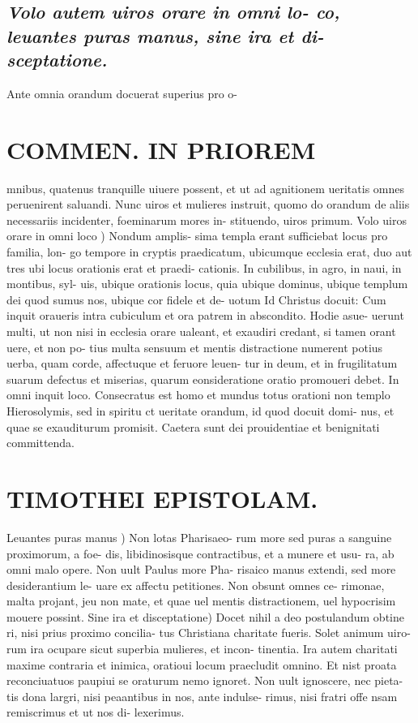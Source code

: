 \documentclass{article}
\begin{document}
\begin{pages}
\subsection*{\textit{Volo autem uiros orare in omni lo- co, leuantes puras manus, sine ira et di- sceptatione. }}\pstart Ante omnia orandum docuerat superius pro o-  \pend
\section*{COMMEN. IN PRIOREM }
\marginpar{[ p.55 ]}\pstart mnibus, quatenus tranquille uiuere possent, et ut ad agnitionem ueritatis omnes peruenirent saluandi. Nunc uiros et mulieres instruit, quomo do orandum de aliis necessariis incidenter, foeminarum mores in- stituendo, uiros primum.  \pend\pstart Volo uiros orare in omni loco ) Nondum amplis- sima templa erant sufficiebat locus pro familia, lon- go tempore in cryptis praedicatum, ubicumque ecclesia erat, duo aut tres ubi locus orationis erat et praedi- cationis. In cubilibus, in agro, in naui, in montibus, syl- uis, ubique orationis locus, quia ubique dominus, ubique  templum dei quod sumus nos, ubique cor fidele et de- uotum Id Christus docuit: Cum inquit oraueris intra cubiculum et ora patrem in abscondito. Hodie asue- uerunt multi, ut non nisi in ecclesia orare ualeant, et exaudiri credant, si tamen orant uere, et non po- tius multa sensuum et mentis distractione numerent potius uerba, quam corde, affectuque et feruore leuen- tur in deum, et in frugilitatum suarum defectus et miserias, quarum eonsideratione oratio promoueri debet. In omni inquit loco. Consecratus est homo et mundus totus orationi non templo Hierosolymis, sed in spiritu ct ueritate orandum, id quod docuit domi- nus, et quae se exauditurum promisit. Caetera sunt dei prouidentiae et benignitati committenda.  \pend
\section*{TIMOTHEI EPISTOLAM. }
\marginpar{[ p.56 ]}\pstart Leuantes puras manus ) Non lotas Pharisaeo- rum more sed puras a sanguine proximorum, a foe- dis, libidinosisque contractibus, et a munere et usu- ra, ab omni malo opere. Non uult Paulus more Pha- risaico manus extendi, sed more desiderantium le- uare ex affectu petitiones. Non obsunt omnes ce- rimonae, malta projant, jeu non mate, et quae uel mentis distractionem, uel hypocrisim mouere possint.  \pend\pstart Sine ira et disceptatione) Docet nihil a deo postulandum obtine ri, nisi prius proximo concilia- tus Christiana charitate fueris. Solet animum uiro- rum ira ocupare sicut superbia mulieres, et incon- tinentia. Ira autem charitati maxime contraria et inimica, oratioui locum praecludit omnino. Et nist proata reconciuatuos paupiui se oraturum nemo ignoret. Non uult ignoscere, nec pieta- tis dona largri, nisi peaantibus in nos, ante indulse- rimus, nisi fratri offe nsam remiscrimus et ut nos di- lexerimus.  \pend
{}
{}

\end{pages}
\end{document}
